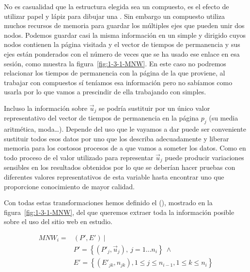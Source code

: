 No es casualidad que la estructura elegida sea un \grafo compuesto, es el efecto de utilizar papel y lápiz para dibujar una \sn. Sin embargo un \grafo compuesto utiliza muchos recursos de memoria para guardar los múltiples ejes que pueden unir dos nodos. Podemos guardar casi la misma información en un \grafo simple y dirigido cuyos nodos contienen la página visitada y el vector de tiempos de permanencia y sus ejes están ponderados con el número de veces que se ha usado ese enlace en esa sesión, como muestra la figura~\ref{fig:1-3-1-MNW}. En este caso no podremos relacionar los tiempos de permanencia con la página de la que proviene, al trabajar con \grafos compuestos sí teníamos esa información pero no sabíamos como usarla por lo que vamos a prescindir de ella trabajando con \grafos simples.

Incluso la información sobre $\overrightarrow{u}_j$ se podría sustituir por un único valor representativo del vector de tiempos de permanencia en la página $p_j$ (su media aritmética, moda\ldots). Depende del uso que le vayamos a dar puede ser conveniente sustituir todos esos datos por uno que los describa adecuadamente y liberar memoria para los costosos procesos de \dm a que vamos a someter los datos. Como en todo proceso de \KDD el valor utilizado para representar $\overrightarrow{u}_j$ puede producir variaciones sensibles en los resultados obtenidos por lo que se deberían hacer pruebas con diferentes valores representativos de esta variable hasta encontrar uno que proporcione conocimiento de mayor calidad.

Con todas estas transformaciones hemos definido el \mnw (\MNW), mostrado en la figura~\ref{fig:1-3-1-MNW}, del que queremos extraer toda la información posible sobre el uso del sitio web en estudio.

\begin{defn}\label{def:1-3-1-MNW}
  \begin{equation}\label{eq:1-3-1-MNW}
     \begin{array}{ll}
        MNW_i = & \left( P', E' \right) \ | \\
              & P' = \left\{ \left(P'_j, \overrightarrow{u}_j \right),\ j = 1\ldots n_i \right\} \ \wedge \\
              & E' = \left\{ \left( E'_{jk}, n_{jk} \right), 1 \leq j \leq n_{i-1}, 1 \leq k \leq n_i \right\} 
     \end{array}
  \end{equation}
\end{defn}



